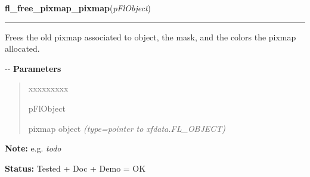     \vspace{0.5ex}

\hspace{.8\funcindent}\begin{boxedminipage}{\funcwidth}

    \raggedright \textbf{fl\_free\_pixmap\_pixmap}(\textit{pFlObject})

    \vspace{-1.5ex}

    \rule{\textwidth}{0.5\fboxrule}
\setlength{\parskip}{2ex}

Frees the old pixmap associated to object, the mask, and the colors the
pixmap allocated.

-{}-
\setlength{\parskip}{1ex}
      \textbf{Parameters}
      \vspace{-1ex}

      \begin{quote}
        \begin{Ventry}{xxxxxxxxx}

          \item[pFlObject]


pixmap object
            {\it (type=pointer to xfdata.FL\_OBJECT)}

        \end{Ventry}

      \end{quote}

\textbf{Note:} 
e.g. \emph{todo}


\textbf{Status:} 
Tested + Doc + Demo = OK


    \end{boxedminipage}

    \label{xformslib:flbitmap:fl_free_pixmap_pixmap}

    \vspace{0.5ex}

